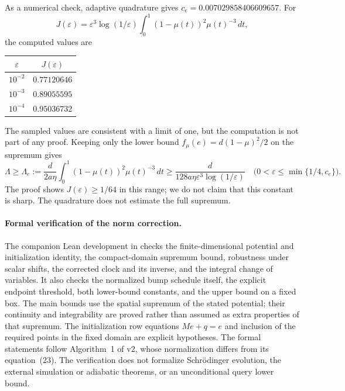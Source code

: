 As a numerical check, adaptive quadrature gives
$c_e=0.007029858406609657$.  For
\[
 J(\varepsilon)=\varepsilon^3\log(1/\varepsilon)
 \int_0^1(1-\mu(t))^2\mu(t)^{-3}\,dt,
\]
the computed values are
\begin{center}
\begin{tabular}{c@{\qquad}c}
\toprule
$\varepsilon$ & $J(\varepsilon)$ \\
\midrule
$10^{-2}$ & $0.77120646$ \\
$10^{-3}$ & $0.89055595$ \\
$10^{-4}$ & $0.95036732$ \\
\bottomrule
\end{tabular}
\end{center}
The sampled values are consistent with a limit of one, but the computation
is not part of any proof.  Keeping only the lower bound
$f_\mu(e)=d(1-\mu)^2/2$ on the supremum gives
\[
 \Lambda\geq\Lambda_e
 :=\frac{d}{2a\eta}\int_0^1
 (1-\mu(t))^2\mu(t)^{-3}\,dt
 \geq\frac{d}{128a\eta\varepsilon^3\log(1/\varepsilon)}
 \quad\bigl(0<\varepsilon\leq\min\{1/4,c_e\}\bigr).
\]
The proof shows $J(\varepsilon)\geq1/64$ in this range; we do not claim
that this constant is sharp.  The quadrature does not estimate the full
supremum.

\paragraph{Formal verification of the norm correction.}
The companion Lean development in 
checks the finite-dimensional potential and initialization identity,
the compact-domain supremum bound, robustness under scalar shifts,
the corrected clock and its inverse, and the integral change of variables.
It also checks the normalized bump schedule itself, the explicit endpoint
threshold, both lower-bound constants, and the upper bound on a fixed box.
The main bounds use the spatial supremum of the stated
potential; their continuity and integrability are proved rather than
assumed as extra properties of that supremum.  The initialization row
equations $Me+q=e$ and inclusion of the required points in the fixed domain
are explicit hypotheses.  The formal statements follow Algorithm~1
of v2, whose normalization differs from its equation~(23).
The verification does not formalize Schr\"odinger evolution, the external
simulation or adiabatic theorems, or an unconditional query lower bound.

